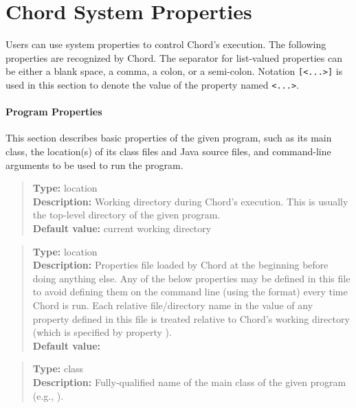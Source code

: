 
\section{Chord System Properties}
\label{sec:chord-sysprops}

Users can use system properties to control Chord's execution.
The following properties are recognized by Chord.
The separator for list-valued properties can be either a blank space, a comma, a colon, or a semi-colon.
Notation {\tt [<...>]} is used in this section to denote the value of the property named {\tt <...>}.

\paragraph{Program Properties} 

This section describes basic properties of the given program, such as
its main class, the location(s) of its class files and Java source
files, and command-line arguments to be used to run the program.
\\[10pt]
\begin{quote}
{\bf Type:} location \\
{\bf Description:} Working directory during Chord's execution.  This is
usually the top-level directory of the given program. \\
{\bf Default value:} current working directory
\end{quote}

\begin{quote}
{\bf Type:} location \\
{\bf Description:} Properties file loaded by Chord at the
beginning before doing anything else.  Any of the below properties may
be defined in this file to avoid defining them on the command line
(using the  format) every time Chord is run.
Each relative file/directory name in the value of any property defined
in this file is treated relative to Chord's working directory (which
is specified by property ). \\
{\bf Default value:} 
\end{quote}

\begin{quote}
{\bf Type:} class \\
{\bf Description:} Fully-qualified name of the main class of the given program (e.g., ).
\end{quote}

